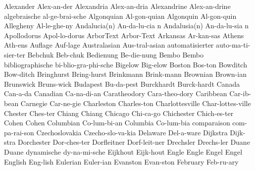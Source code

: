 \begingroup
\eightpoint
\1 Alexander		Alex-an-der		%
\NewWordtrue
\1 Alexandria		Alex-an-dria		%
\1 Alexandrine		Alex-an-drine		%
\1 algebraische 	al-ge-brai-sche
\1 Algonquian		Al-gon-quian		%
\1 Algonquin		Al-gon-quin		%
\1 Allegheny		Al-le-ghe-ny
\NewWordtrue
\2 Andalucia(n) 	An-da-lu-cia n		%
\NewWordtrue
\2 Andalusia(n) 	An-da-lu-sia n		%
\1 Apollodorus		Apol-lo-dorus		%
\NewWordtrue
\1 ArborText		Arbor-Text \thinspace*	%
\1 Arkansas		Ar-kan-sas
\NewWordtrue
\1 Athens		Ath-ens			%
\1 Auflage		Auf-lage		%
\1 Australasian 	Aus-tral-asian
\1 automatisierter	auto-ma-ti-sier-ter
\1 Bebchuk		Beb-chuk		%
\1 Bedienung		Be-die-nung
\1 Bembo                Bembo			%
\1 bibliographische	bi-blio-gra-phi-sche
\NewWordtrue
\1 Bigelow		Big-elow		%
\1 Boston		Bos-ton
\NewWordtrue
\1 Bowditch		Bow-ditch		%
\NewWordtrue
\1 Bringhurst		Bring-hurst		%
\NewWordtrue
\1 Brinkmann		Brink-mann		%
\1 Brownian		Brown-ian
\1 Brunswick		Bruns-wick
\1 Budapest		Bu-da-pest
\1 Burckhardt		Burck-hardt		%
\NewWordtrue
\1 Canada		Can-a-da 		%
\NewWordtrue
\1 Canadian		Ca-na-di-an 		%
\1 Caratheodory 	Cara-theo-dory		%
\1 Caribbean		Car-ib-bean
\NewWordtrue
\1 Carnegie		Car-ne-gie		%
\1 Charleston		Charles-ton
\1 Charlottesville	Char-lottes-ville
\1 Chester		Ches-ter		%
\1 Chiang		Chiang			%
\NewWordtrue
\1 Chicago		Chi-ca-go 		%
\1 Chichester		Chich-es-ter		%
\1 Cohen		Cohen			%
\NewWordtrue
\1 Columbian		Co-lum-bi-an		%
\1 Columbia		Co-lum-bia
\NewWordtrue
\1 comparaison		com-pa-rai-son		%
\1 Czechoslovakia	Czecho-slo-va-kia
\1 Delaware		Del-a-ware		%
\1 Dijkstra		Dijk-stra
\1 Dorchester		Dor-ches-ter		%
\1 Dorfleitner		Dorf-leit-ner		%
\1 Drechsler		Drechs-ler		%
\1 Duane		Duane			%
\1 dynamische		dy-na-mi-sche
\1 Eijkhout		Eijk-hout		%
\1 Engle		Engle			%
\1 Engel		Engel			%
\1 English		Eng-lish
\1 Eulerian		Euler-ian
\1 Evanston		Evan-ston
\1 February		Feb-ru-ary

